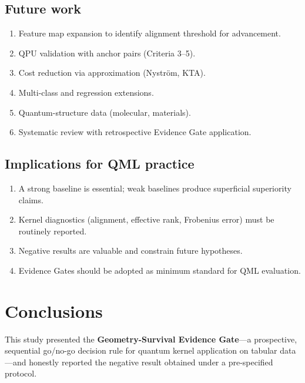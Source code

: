 \documentclass[11pt,a4paper]{article}
\begin{document}
\subsection{Future work}
\label{ssec:future}

\begin{enumerate}[label=(\roman*)]
  \item Feature map expansion to identify alignment threshold for advancement.
  \item QPU validation with anchor pairs (Criteria 3--5).
  \item Cost reduction via approximation (Nystr\"om, KTA).
  \item Multi-class and regression extensions.
  \item Quantum-structure data (molecular, materials).
  \item Systematic review with retrospective Evidence Gate application.
\end{enumerate}

\subsection{Implications for QML practice}
\label{ssec:implications}

\begin{enumerate}[label=(\roman*)]
  \item A strong baseline is essential; weak baselines produce superficial
        superiority claims.
  \item Kernel diagnostics (alignment, effective rank, Frobenius error) must
        be routinely reported.
  \item Negative results are valuable and constrain future hypotheses.
  \item Evidence Gates should be adopted as minimum standard for QML
        evaluation.
\end{enumerate}

\section{Conclusions}
\label{sec:conclusions}

This study presented the \textbf{Geometry-Survival Evidence Gate}---a
prospective, sequential go/no-go decision rule for quantum kernel application
on tabular data---and honestly reported the negative result obtained under a
pre-specified protocol.
\end{document}
